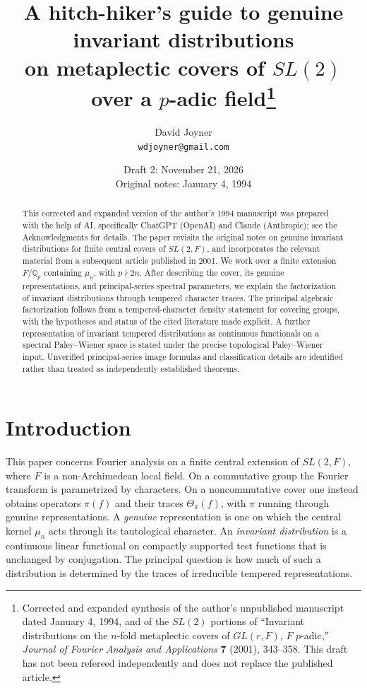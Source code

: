 \documentclass[12pt,letterpaper]{article}
\theoremstyle{definition}
\theoremstyle{remark}
\begin{document}
\title{A hitch-hiker's guide to genuine invariant distributions\\
 on metaplectic covers of $SL(2)$ over a $p$-adic field\thanks{Corrected and expanded synthesis of the author's unpublished manuscript dated
 January 4, 1994, and of the $SL(2)$ portions of
 ``Invariant distributions on the $n$-fold metaplectic covers of $GL(r,F)$, $F$ $p$-adic,''
 \emph{Journal of Fourier Analysis and Applications} \textbf{7} (2001), 343--358.
 This draft has not been refereed independently and does not replace the published article.}}
\author{David Joyner\\\texttt{wdjoyner@gmail.com}}
\date{Draft 2: November 21, 2026\\Original notes: January 4, 1994}
\maketitle

\begin{abstract}
This corrected and expanded version of the author's 1994 manuscript was prepared
with the help of AI, specifically ChatGPT (OpenAI) and Claude (Anthropic); see
the Acknowledgments for details.  The paper revisits the original notes on
genuine invariant distributions for
finite central covers of $SL(2,F)$, and incorporates the relevant material from a
subsequent article published in 2001.  We work over a finite extension $F/\mathbb Q_p$
containing $\mu_n$, with $p\nmid 2n$.  After describing the cover, its genuine
representations, and principal-series spectral parameters, we explain the
factorization of invariant distributions through tempered character traces.
The principal algebraic factorization follows from a tempered-character density
statement for covering groups, with the hypotheses and status of the cited
literature made explicit.  A further representation of invariant tempered
distributions as continuous functionals on a spectral Paley--Wiener space is
stated under the precise topological Paley--Wiener input.  Unverified
principal-series image formulas and classification details are identified rather
than treated as independently established theorems.

\end{abstract}


\section{Introduction}\label{sec:intro}
This paper concerns Fourier analysis on a finite central extension of
$SL(2,F)$, where $F$ is a non-Archimedean local field.  On a commutative
group the Fourier transform is parametrized by characters.  On a noncommutative
cover one instead obtains operators $\pi(f)$ and their traces
$\Theta_\pi(f)$, with $\pi$ running through genuine representations.
A \emph{genuine} representation is one on which the central kernel $\mu_n$
acts through its tautological character.  An \emph{invariant distribution}
is a continuous linear functional on compactly supported test functions
that is unchanged by conjugation.  The principal question is how much of
such a distribution is determined by the traces of irreducible tempered
representations.
\end{document}
